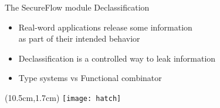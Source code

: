 \begin{frame}{The SecureFlow module \newline Declassification}
	\vspace{-3cm}
	\begin{itemize}
		\item Real-word applications release some information \\as part of their intended behavior
		\item Declassification is a controlled way to leak information
		\item Type systems vs Functional combinator
	\end{itemize}
	\begin{textblock*}{2cm}(10.5cm,1.7cm)
		\texttt{[image: hatch]}
	\end{textblock*}
\end{frame}
	